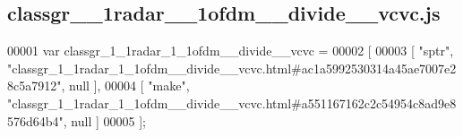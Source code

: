\subsection{classgr\+\_\+\_\+1radar\+\_\+\_\+1ofdm\+\_\+\+\_\+divide\+\_\+\+\_\+vcvc.\+js}
\label{classgr__1__1radar__1__1ofdm____divide____vcvc_8js_source}

\begin{DoxyCode}
00001 var classgr_1_1radar_1_1ofdm__divide__vcvc =
00002 [
00003     [ \textcolor{stringliteral}{"sptr"}, \textcolor{stringliteral}{"classgr\_1\_1radar\_1\_1ofdm\_\_divide\_\_vcvc.html#ac1a5992530314a45ae7007e28c5a7912"}, null ],
00004     [ \textcolor{stringliteral}{"make"}, \textcolor{stringliteral}{"classgr\_1\_1radar\_1\_1ofdm\_\_divide\_\_vcvc.html#a551167162c2c54954c8ad9e8576d64b4"}, null ]
00005 ];
\end{DoxyCode}
